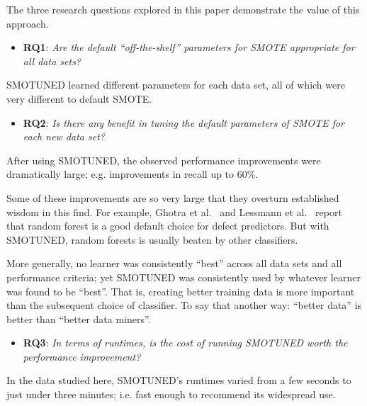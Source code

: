 \documentclass[10pt,conference]{IEEEtran}
\newcommand{\bi}{\begin{itemize}[leftmargin=0.4cm]}
\newcommand{\ei}{\end{itemize}}
\theoremstyle{break}
\theoremstyle{break}
\newcommand{\sma}{{\sc SMOTE}}
\newcommand{\smb}{{\sc SMOTUNED}}
\begin{document}
The three research questions explored in this paper demonstrate the value of this approach.
 \bi
 \item
  \textbf{RQ1}:  {\em Are the default ``off-the-shelf'' parameters for {\sma} appropriate for
  all data sets?} 
  \ei
 \begin{lesson}{\smb} learned different parameters for each data set, all of which  were very different to default SMOTE.
 \end{lesson}
  \bi
  \item
  \textbf{RQ2}: {\em   Is  there any benefit in tuning the default parameters of {\sma} for
  each new data set?} 
  \ei
   \begin{lesson}After using {\smb}, the observed performance improvements were dramatically large; e.g. improvements in recall  up to 60\%.
 \end{lesson}
Some of these improvements are so very large that they overturn established wisdom in this find.
For example,  Ghotra et al.~\cite{ghotra2015revisiting} and Lessmann et al.~\cite{lessmann2008benchmarking}
 report that   random forest is a  good default choice for  defect predictors.
But with  SMOTUNED, random forests is usually
beaten by other classifiers. 

More generally, no learner was consistently ``best'' across all data sets and all performance criteria; yet {\smb} was consistently  used by  whatever  learner was found to be ``best''.  
That is,  creating better training data is more important
than the subsequent choice of classifier.  To say that another way: ``better data'' is better than ``better data miners''.
 
  
   \bi
  \item
  \textbf{RQ3}: {\em  In terms of runtimes, is the cost of running SMOTUNED worth the performance improvement?}
  \ei
  
   \begin{lesson}In the data studied here,
   SMOTUNED's  runtimes
   varied  from a few seconds to just under
   three minutes;  i.e.  fast enough
   to recommend its widespread use.
 \end{lesson}
\end{document}
